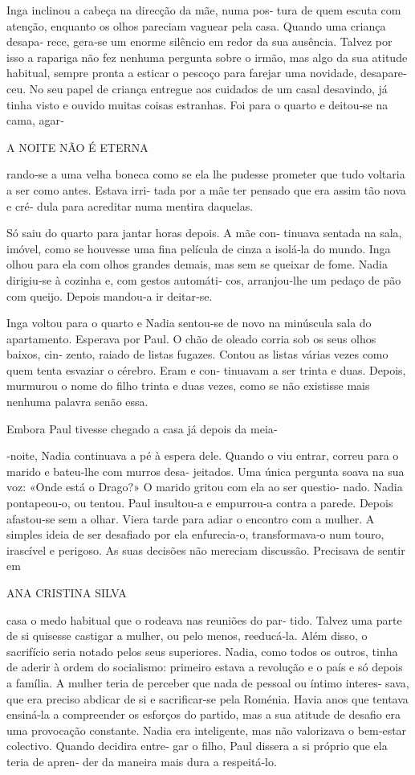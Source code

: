 Inga inclinou a cabeça na direcção da mãe, numa pos‑ tura de quem escuta
com atenção, enquanto os olhos pareciam vaguear pela casa. Quando uma
criança desapa‑ rece, gera‑se um enorme silêncio em redor da sua
ausência. Talvez por isso a rapariga não fez nenhuma pergunta sobre o
irmão, mas algo da sua atitude habitual, sempre pronta a esticar o
pescoço para farejar uma novidade, desapare‑ ceu. No seu papel de
criança entregue aos cuidados de um casal desavindo, já tinha visto e
ouvido muitas coisas estranhas. Foi para o quarto e deitou‑se na cama,
agar‑

A NOITE NÃO É ETERNA

rando‑se a uma velha boneca como se ela lhe pudesse prometer que tudo
voltaria a ser como antes. Estava irri‑ tada por a mãe ter pensado que
era assim tão nova e cré‑ dula para acreditar numa mentira daquelas.

Só saiu do quarto para jantar horas depois. A mãe con‑ tinuava sentada
na sala, imóvel, como se houvesse uma fina película de cinza a isolá‑la
do mundo. Inga olhou para ela com olhos grandes demais, mas sem se
queixar de fome. Nadia dirigiu‑se à cozinha e, com gestos automáti‑ cos,
arranjou‑lhe um pedaço de pão com queijo. Depois mandou‑a ir deitar‑se.

Inga voltou para o quarto e Nadia sentou‑se de novo na minúscula sala do
apartamento. Esperava por Paul. O chão de oleado corria sob os seus
olhos baixos, cin‑ zento, raiado de listas fugazes. Contou as listas
várias vezes como quem tenta esvaziar o cérebro. Eram e con‑ tinuavam a
ser trinta e duas. Depois, murmurou o nome do filho trinta e duas vezes,
como se não existisse mais nenhuma palavra senão essa.

Embora Paul tivesse chegado a casa já depois da meia‑

‑noite, Nadia continuava a pé à espera dele. Quando o viu entrar, correu
para o marido e bateu‑lhe com murros desa‑ jeitados. Uma única pergunta
soava na sua voz: «Onde está o Drago?» O marido gritou com ela ao ser
questio‑ nado. Nadia pontapeou‑o, ou tentou. Paul insultou‑a e
empurrou‑a contra a parede. Depois afastou‑se sem a olhar. Viera tarde
para adiar o encontro com a mulher. A simples ideia de ser desafiado por
ela enfurecia‑o, transformava‑o num touro, irascível e perigoso. As suas
decisões não mereciam discussão. Precisava de sentir em

ANA CRISTINA SILVA

casa o medo habitual que o rodeava nas reuniões do par‑ tido. Talvez uma
parte de si quisesse castigar a mulher, ou pelo menos, reeducá‑la. Além
disso, o sacrifício seria notado pelos seus superiores. Nadia, como
todos os outros, tinha de aderir à ordem do socialismo: primeiro estava
a revolução e o país e só depois a família. A mulher teria de perceber
que nada de pessoal ou íntimo interes‑ sava, que era preciso abdicar de
si e sacrificar‑se pela Roménia. Havia anos que tentava ensiná‑la a
compreender os esforços do partido, mas a sua atitude de desafio era uma
provocação constante. Nadia era inteligente, mas não valorizava o
bem‑estar colectivo. Quando decidira entre‑ gar o filho, Paul dissera a
si próprio que ela teria de apren‑ der da maneira mais dura a
respeitá‑lo.


